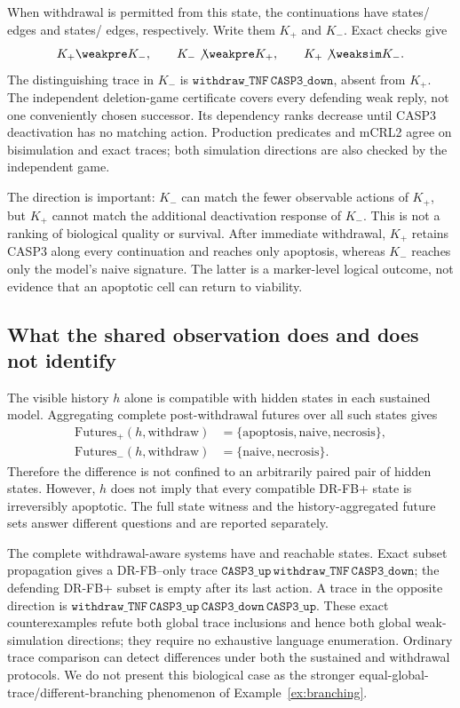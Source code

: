 When withdrawal is permitted from this state, the continuations have
\DRLocalPlusStates{} states/\DRLocalPlusEdges{} edges and
\DRLocalMinusStates{} states/\DRLocalMinusEdges{} edges, respectively.
Write them $K_+$ and $K_-$. Exact checks give
\[
 K_+\weakpre K_-,\qquad K_-\not\weakpre K_+,\qquad
 K_+\not\weaksim K_-.
\]
The distinguishing trace in $K_-$ is
$\texttt{withdraw\_TNF}\,\texttt{CASP3\_down}$, absent from $K_+$.
The independent deletion-game certificate covers every defending weak reply,
not one conveniently chosen successor. Its dependency ranks decrease until
CASP3 deactivation has no matching action. Production predicates and mCRL2
agree on bisimulation and exact traces; both simulation directions are also
checked by the independent game.

The direction is important: $K_-$ can match the fewer observable actions of
$K_+$, but $K_+$ cannot match the additional deactivation response of $K_-$.
This is not a ranking of biological quality or survival. After immediate
withdrawal, $K_+$ retains CASP3 along every continuation and reaches only
apoptosis, whereas $K_-$ reaches only the model's naive signature. The latter
is a marker-level logical outcome, not evidence that an apoptotic cell can
return to viability.

\subsection{What the shared observation does and does not identify}

The visible history $h$ alone is compatible with \DRHistoryStates{} hidden
states in each sustained model. Aggregating complete post-withdrawal futures
over all such states gives
\[
\begin{split}
\mathrm{Futures}_+(h,\mathrm{withdraw})
 &=\{\mathrm{apoptosis},\mathrm{naive},\mathrm{necrosis}\},\\
\mathrm{Futures}_-(h,\mathrm{withdraw})
 &=\{\mathrm{naive},\mathrm{necrosis}\}.
\end{split}
\]
Therefore the difference is not confined to an arbitrarily paired pair of
hidden states. However, $h$ does not imply that every compatible DR-FB+ state
is irreversibly apoptotic. The full state witness and the history-aggregated
future sets answer different questions and are reported separately.

The complete withdrawal-aware systems have \DRControlPlusStates{} and
\DRControlMinusStates{} reachable states. Exact subset propagation gives a
DR-FB--only trace
$\texttt{CASP3\_up}\,\texttt{withdraw\_TNF}\,\texttt{CASP3\_down}$;
the defending DR-FB+ subset is empty after its last action. A trace in the
opposite direction is
$\texttt{withdraw\_TNF}\,\texttt{CASP3\_up}\,\texttt{CASP3\_down}\,
\texttt{CASP3\_up}$.
These exact counterexamples refute both global trace inclusions and hence both
global weak-simulation directions; they require no exhaustive language
enumeration. Ordinary trace comparison can detect differences under both the
sustained and withdrawal protocols. We do not present this biological
case as the stronger equal-global-trace/different-branching phenomenon of
Example~\ref{ex:branching}.

